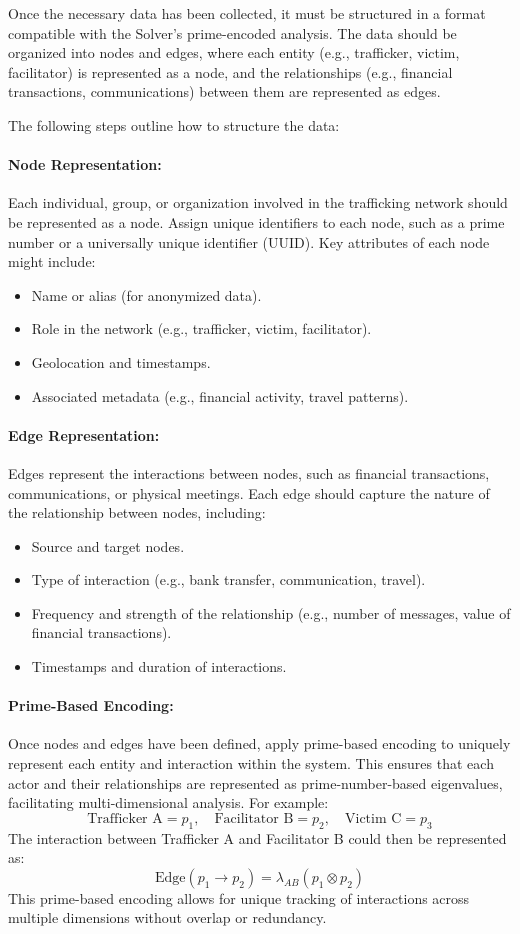 \documentclass[%
 preprint, linenumbers,
 amsmath,amssymb,
 aps, physrev,
]{revtex4-2}
\begin{document}
Once the necessary data has been collected, it must be structured in a format compatible with the Solver’s prime-encoded analysis. The data should be organized into nodes and edges, where each entity (e.g., trafficker, victim, facilitator) is represented as a node, and the relationships (e.g., financial transactions, communications) between them are represented as edges.

The following steps outline how to structure the data:

\paragraph{Node Representation:}
Each individual, group, or organization involved in the trafficking network should be represented as a node. Assign unique identifiers to each node, such as a prime number or a universally unique identifier (UUID). Key attributes of each node might include:
\begin{itemize}
    \item Name or alias (for anonymized data).
    \item Role in the network (e.g., trafficker, victim, facilitator).
    \item Geolocation and timestamps.
    \item Associated metadata (e.g., financial activity, travel patterns).
\end{itemize}

\paragraph{Edge Representation:}
Edges represent the interactions between nodes, such as financial transactions, communications, or physical meetings. Each edge should capture the nature of the relationship between nodes, including:
\begin{itemize}
    \item Source and target nodes.
    \item Type of interaction (e.g., bank transfer, communication, travel).
    \item Frequency and strength of the relationship (e.g., number of messages, value of financial transactions).
    \item Timestamps and duration of interactions.
\end{itemize}

\paragraph{Prime-Based Encoding:}
Once nodes and edges have been defined, apply prime-based encoding to uniquely represent each entity and interaction within the system. This ensures that each actor and their relationships are represented as prime-number-based eigenvalues, facilitating multi-dimensional analysis. For example:
\[
\text{Trafficker A} = p_1, \quad \text{Facilitator B} = p_2, \quad \text{Victim C} = p_3
\]
The interaction between Trafficker A and Facilitator B could then be represented as:
\[
\text{Edge}(p_1 \rightarrow p_2) = \lambda_{AB} (p_1 \otimes p_2)
\]
This prime-based encoding allows for unique tracking of interactions across multiple dimensions without overlap or redundancy.
\end{document}
